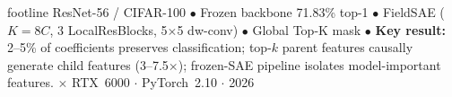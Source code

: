 \documentclass[final]{beamer}
\begin{document}
\begin{frame}[t]
\begin{beamercolorbox}[wd=\paperwidth, ht=2.5cm, center, sep=0.5cm]{footline}
  {\small ResNet-56 / CIFAR-100 \quad $\bullet$ \quad Frozen backbone 71.83\% top-1 \quad $\bullet$ \quad
   FieldSAE ($K{=}8C$, 3 LocalResBlocks, 5$\times$5 dw-conv) \quad $\bullet$ \quad Global Top-K mask \quad $\bullet$ \quad
   \textbf{Key result:} 2--5\% of coefficients preserves classification; top-$k$ parent features causally
   generate child features (3--7.5$\times$); frozen-SAE pipeline isolates model-important features. $\times$ RTX~6000 $\cdot$ PyTorch~2.10 $\cdot$ 2026}
\end{beamercolorbox}

\end{frame}
\end{document}
